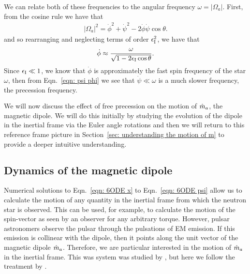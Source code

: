 \documentclass[../full_thesis/full_thesis.tex]{subfiles}
\begin{document}
We can relate both of these frequencies to the angular frequency $\omega = |\Omega_a|$.
First, from the cosine rule we have that
\begin{align}
|\Omega_a|^{2} = \dot{\phi}^{2}+\dot{\psi}^{2} - 2\dot{\phi}\dot{\psi}\cos\theta.
\end{align}
and so rearranging and neglecting terms of order $\epsilon_{\mathrm{I}}^{2}$, we have that
\begin{align}
\dot{\phi} \approx \frac{\omega}{\sqrt{1- 2\epsilon_{\mathrm{I}}\cos\theta}}.
\label{eqn: phi dot}
\end{align}
Since $\epsilon_{\mathrm{I}} \ll 1$, we know that $\dot{\phi}$ is approximately the fast spin frequency
of the star $\omega$, then from Eqn.~\eqref{eqn: psi phi} we see that $\dot{\psi} \ll \omega$
is a much slower frequency, the precession frequency.


We will now discuss the effect of free precession on the motion of $\hat{m}_a$, the
magnetic dipole. We will do this initially by studying the evolution of the
dipole in the inertial frame via the Euler angle rotations and then we will
return to this reference frame picture in Section~\ref{sec: understanding the
motion of m} to provide a deeper intuitive understanding.

\subsection{Dynamics of the magnetic dipole}

Numerical solutions to Eqn.~\eqref{eqn: 6ODE x} to Eqn.~\eqref{eqn: 6ODE psi}
allow us to calculate the motion of any quantity in the inertial frame from
which the neutron star is observed.  This can be used, for example, to
calculate the motion of the spin-vector as seen by an observer for any
arbitrary torque. However, pulsar astronomers observe the pulsar through the
pulsations of EM emission. If this emission is collinear with the dipole, then
it points along the unit vector of the magnetic dipole $\hat{m}_a$. Therefore, we
are particular interested in the motion of $\hat{m}_a$ in the inertial frame. This
was system was studied by \citet{bisnovatyi1990model}, but here we follow the
treatment by \citet{Jones2001}.
\end{document}
